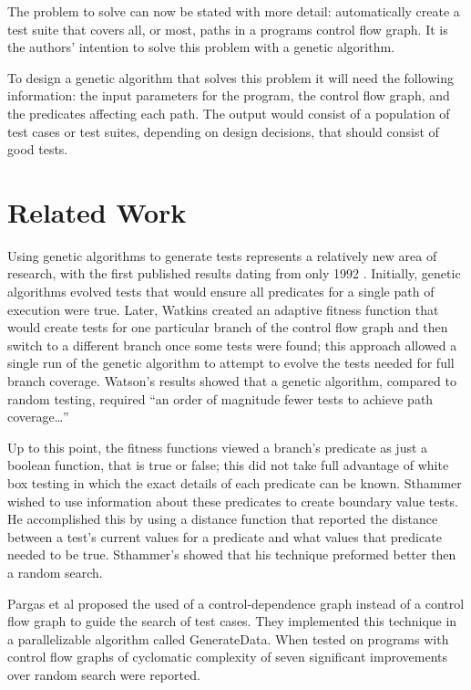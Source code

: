 \documentclass[runningheads]{llncs}
\begin{document}
The problem to solve can now be stated with more detail: automatically create a test suite that covers all, or most, paths in a programs control flow graph. It is the authors' intention to solve this problem with a genetic algorithm. 

To design a genetic algorithm that solves this problem it will need the following information: the input parameters for the program, the control flow graph, and the predicates affecting each path. The output would consist of a population of test cases or test suites, depending on design decisions, that should consist of good tests. 

\newpage
\section{Related Work}
Using genetic algorithms to generate tests represents a relatively new area of research, with the first published results dating from only 1992 \cite{apps5}. Initially, genetic algorithms evolved tests that would ensure all predicates for a single path of execution were true\cite{limits6}. Later, Watkins created an adaptive fitness function that would create tests for one particular branch of the control flow graph and then switch to a different branch once some tests were found; this approach allowed a single run of the genetic algorithm to attempt to evolve the tests needed for full branch coverage\cite{limits6}. Watson's results showed that a genetic algorithm, compared to random testing, required ``an order of magnitude fewer tests to achieve path coverage…''\cite{limits6} 

Up to this point, the fitness functions viewed a branch's predicate as just a boolean function, that is true or false; this did not take full advantage of white box testing in which the exact details of each predicate can be known. Sthammer wished to use information about these predicates to create boundary value tests. He accomplished this by using a distance function that reported the distance between a test's current values for a predicate and what values that predicate needed to be true. Sthammer's showed that his technique preformed better then a random search. 

Pargas et al proposed the used of a control-dependence graph instead of a control flow graph to guide the search of test cases. They implemented this technique in a parallelizable algorithm called GenerateData\cite{pargas8}. When tested on programs with control flow graphs of cyclomatic complexity of seven significant improvements over random search were reported\cite{pargas8}.
\end{document}
